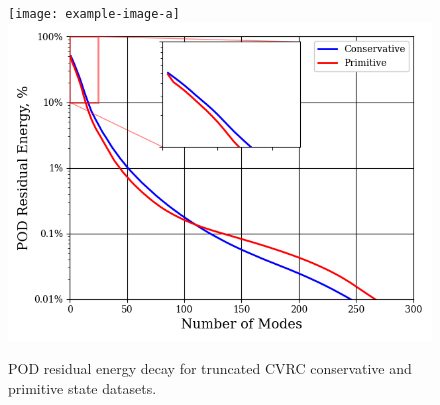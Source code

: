 \begin{figure}
	\centering
	\ifdefined\DRAFT
		\texttt{[image: example-image-a]}
	\else
		\includegraphics[width=0.8\linewidth]{Chapters/CavityAndCVRC/Images/cvrc/cvrc_pod_energy_0p5ms.png}
	\fi
	\caption{\label{fig:cvrcPODEnergy}POD residual energy decay for truncated CVRC conservative and primitive state datasets.}
\end{figure}

